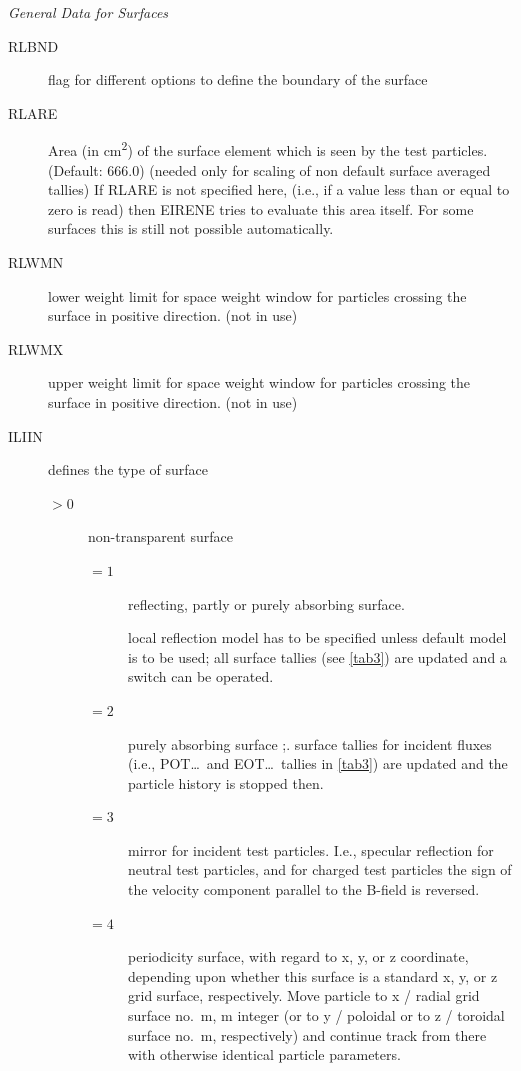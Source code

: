 \textsl{General Data for Surfaces}
\begin{description}
  \item[RLBND] flag for different options to define the boundary of the surface
  \item[RLARE] Area (in \si{\square\centi\metre}) of the surface element which is
        seen by the test particles.
        (Default: 666.0) (needed only for scaling of non default surface averaged
        tallies) If RLARE is not specified here, (i.e., if a value less than or equal
        to zero is read) then EIRENE tries to evaluate this area itself.
        For some surfaces this is still not possible automatically.
  \item[RLWMN] lower weight limit for space weight window for particles crossing
        the surface in positive direction.
        (not in use)
  \item[RLWMX] upper weight limit for space weight window for
        particles crossing the surface in positive direction.
        (not in use)
  \item[ILIIN] defines the type of surface
        \begin{description}
          \item[$> 0$] non-transparent surface
                \begin{description}
                  \item[$= 1$]
                        reflecting, partly or purely absorbing surface.

                        local reflection model has to be specified unless
                        default model is
                        to be used; all surface tallies (see \cref{tab3})
                        are updated and a switch can be operated.
                  \item[$= 2$] purely absorbing surface ;.
                        surface tallies for incident fluxes
                        (i.e., POT\dots\ and EOT\dots\ tallies in \cref{tab3})
                        are updated and the particle history is stopped then.
                  \item[$= 3$] mirror for incident test particles.
                        I.e., specular reflection for neutral test particles, and for charged test
                        particles the sign of the velocity component parallel to the B-field is
                        reversed.
                  \item[$= 4$] periodicity surface, with regard to x, y, or z coordinate,
                        depending upon whether this surface is a standard x, y, or z grid surface,
                        respectively.
                        Move particle to x / radial grid surface no.\ m, m integer (or to y / poloidal
                        or to z / toroidal surface no.\ m, respectively) and continue track from there
                        with otherwise identical particle parameters.


\end{description}
\end{description}
\end{description}
